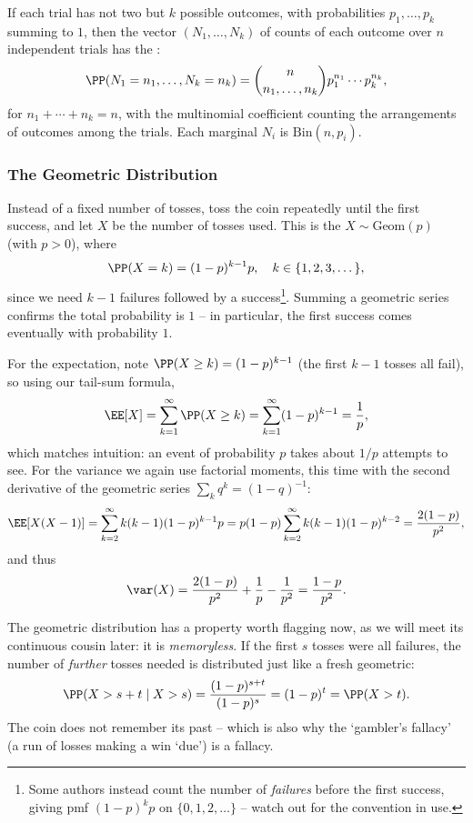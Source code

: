 \begin{remark}
	If each trial has not two but $k$ possible outcomes, with probabilities $p_1, \dots, p_k$ summing to $1$, then the vector $(N_1, \dots, N_k)$ of counts of each outcome over $n$ independent trials has the :
	$$
	\PP(N_1 = n_1, \dots, N_k = n_k) = \binom{n}{n_1, \dots, n_k}p_1^{n_1}\cdots p_k^{n_k},
	$$
	for $n_1 + \cdots + n_k = n$, with the multinomial coefficient counting the arrangements of outcomes among the trials. Each marginal $N_i$ is $\mathrm{Bin}(n, p_i)$.
\end{remark}

\subsubsection*{The Geometric Distribution}

Instead of a fixed number of tosses, toss the coin repeatedly until the first success, and let $X$ be the number of tosses used. This is the  $X \sim \mathrm{Geom}(p)$ (with $p > 0$), where
$$
\PP(X = k) = (1 - p)^{k - 1} p, \quad k \in \{1, 2, 3, \dots \},
$$
since we need $k - 1$ failures followed by a success\footnote{Some authors instead count the number of \emph{failures} before the first success, giving pmf $(1-p)^k p$ on $\{0, 1, 2, \dots\}$ -- watch out for the convention in use.}. Summing a geometric series confirms the total probability is $1$ -- in particular, the first success comes eventually with probability $1$.

For the expectation, note $\PP(X \geq k) = (1-p)^{k - 1}$ (the first $k - 1$ tosses all fail), so using our tail-sum formula,
$$
\EE[X] = \sum_{k = 1}^{\infty} \PP(X \geq k) = \sum_{k = 1}^{\infty} (1 - p)^{k - 1} = \frac{1}{p},
$$
which matches intuition: an event of probability $p$ takes about $1/p$ attempts to see. For the variance we again use factorial moments, this time with the second derivative of the geometric series $\sum_{k} q^k = (1-q)^{-1}$:
$$
\EE[X(X-1)] = \sum_{k = 2}^{\infty} k(k - 1)(1-p)^{k-1} p = p(1-p)\sum_{k=2}^{\infty} k(k-1)(1-p)^{k - 2} = \frac{2(1-p)}{p^2},
$$
and thus
$$
\var(X) = \frac{2(1-p)}{p^2} + \frac{1}{p} - \frac{1}{p^2} = \frac{1 - p}{p^2}.
$$

The geometric distribution has a property worth flagging now, as we will meet its continuous cousin later: it is \emph{memoryless}. If the first $s$ tosses were all failures, the number of \emph{further} tosses needed is distributed just like a fresh geometric:
$$
\PP(X > s + t \mid X > s) = \frac{(1-p)^{s + t}}{(1 - p)^s} = (1-p)^t = \PP(X > t).
$$
The coin does not remember its past -- which is also why the `gambler's fallacy' (a run of losses making a win `due') is a fallacy.

